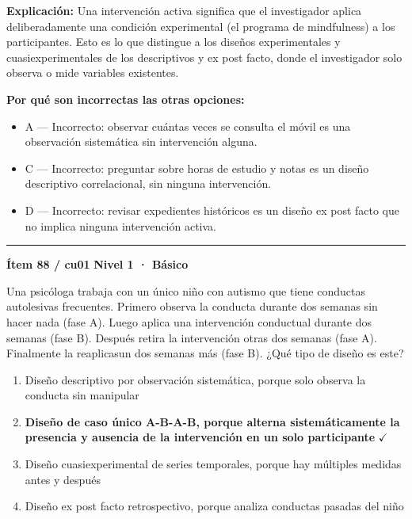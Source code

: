 \documentclass[12pt,a4paper]{article}
\begin{document}
\noindent\textbf{\color{azul}Explicación:} Una intervención activa significa que el investigador aplica deliberadamente una condición experimental (el programa de mindfulness) a los participantes. Esto es lo que distingue a los diseños experimentales y cuasiexperimentales de los descriptivos y ex post facto, donde el investigador solo observa o mide variables existentes.

\noindent\textbf{\color{gris}Por qué son incorrectas las otras opciones:}
\begin{itemize}
  \item {\small A — Incorrecto: observar cuántas veces se consulta el móvil es una observación sistemática sin intervención alguna.}
  \item {\small C — Incorrecto: preguntar sobre horas de estudio y notas es un diseño descriptivo correlacional, sin ninguna intervención.}
  \item {\small D — Incorrecto: revisar expedientes históricos es un diseño ex post facto que no implica ninguna intervención activa.}
\end{itemize}
\vspace{8pt}\hrule\vspace{10pt}

\begin{mdframed}[backgroundcolor=fondogris,linecolor=azul,linewidth=1pt,innerleftmargin=10pt,innerrightmargin=10pt,innertopmargin=7pt,innerbottommargin=7pt]
\textbf{Ítem 88 / cu01} \hfill {\small\bfseries\color{azul} Nivel 1 · Básico}
\end{mdframed}

Una psicóloga trabaja con un único niño con autismo que tiene conductas autolesivas frecuentes. Primero observa la conducta durante dos semanas sin hacer nada (fase A). Luego aplica una intervención conductual durante dos semanas (fase B). Después retira la intervención otras dos semanas (fase A). Finalmente la reaplicasun dos semanas más (fase B). ¿Qué tipo de diseño es este?

\begin{enumerate}
  \item[A.] Diseño descriptivo por observación sistemática, porque solo observa la conducta sin manipular
  \item[\textbf{\color{verde}B.}] \textbf{\color{verde} Diseño de caso único A-B-A-B, porque alterna sistemáticamente la presencia y ausencia de la intervención en un solo participante} \hfill $\checkmark$
  \item[C.] Diseño cuasiexperimental de series temporales, porque hay múltiples medidas antes y después
  \item[D.] Diseño ex post facto retrospectivo, porque analiza conductas pasadas del niño
\end{enumerate}
\end{document}
